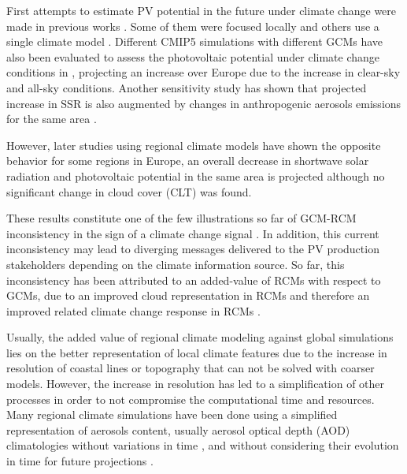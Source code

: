 First attempts to estimate PV potential in the future under climate change were made in previous works \cite*{Crook2011, panagea2014, Gaetani2014, Burnett2014}. Some of them were focused locally \cite*{panagea2014, Burnett2014} and others use a single climate model \cite*{Crook2011}. Different CMIP5 simulations with different GCMs have also been evaluated to assess the photovoltaic potential under climate change conditions in \cite*{Wild2015}, projecting an increase over Europe due to the increase in clear-sky and all-sky conditions. Another sensitivity study has shown that projected increase in SSR is also augmented by changes in anthropogenic aerosols emissions for the same area \cite*{Gaetani2014}.

However, later studies using regional climate models \cite*{Jerez2015, Bartok2017} have shown the opposite behavior for some regions in Europe, an overall decrease in shortwave solar radiation and photovoltaic potential in the same area is projected although no significant change in cloud cover (CLT) was found. %

These results constitute one of the few illustrations so far of GCM-RCM inconsistency in the sign of a climate change signal \cite*{Bartok2017}. In addition, this current inconsistency may lead to diverging messages delivered to the PV production stakeholders depending on the climate information source. So far, this inconsistency has been attributed to an added-value of RCMs with respect to GCMs, due to an improved cloud representation in RCMs and therefore an improved related climate change response in RCMs \cite*{Bartok2017}.

Usually, the added value of regional climate modeling against global simulations lies on the better representation of local climate features due to the increase in resolution of coastal lines or topography that can not be solved with coarser models. However, the increase in resolution has led to a simplification of other processes in order to not compromise the computational time and resources. Many regional climate simulations have been done using a simplified representation of aerosols content, usually aerosol optical depth (AOD) climatologies without variations in time \cite*{Nabat2013, Nabat2014}, and without considering their evolution in time for future projections \cite*{Bartok2017}.



